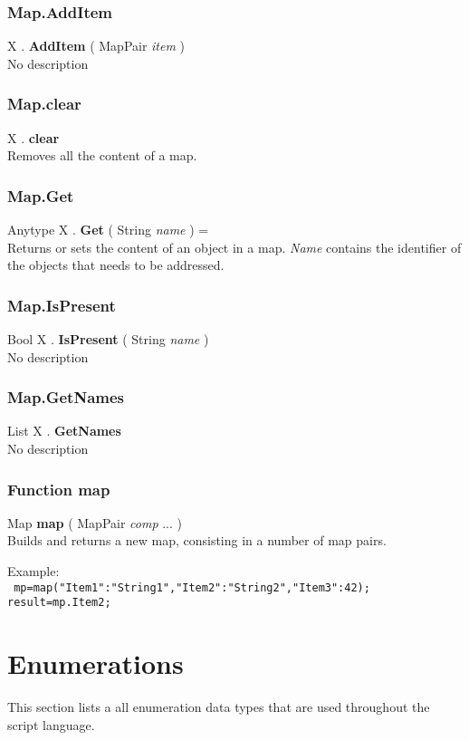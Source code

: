 \documentclass[10pt]{book}
\newcommand{\sourcecode}[1]{\texttt{#1}}
\newcommand{\var}[1]{\textit{#1}}
\begin{document}
\subsubsection{Map.AddItem \label{F:Map:AddItem}}
X . \textbf{AddItem} ( MapPair \textit{item} ) \\
No description

\subsubsection{Map.clear \label{F:Map:clear}}
X . \textbf{clear} \\
Removes all the content of a map.

\subsubsection{Map.Get \label{F:Map:Get}}
Anytype X . \textbf{Get} ( String \textit{name} ) = \\
Returns or sets the content of an object in a map. \var{Name} contains the identifier of the objects that needs to be addressed.

\subsubsection{Map.IsPresent \label{F:Map:IsPresent}}
Bool X . \textbf{IsPresent} ( String \textit{name} ) \\
No description

\subsubsection{Map.GetNames \label{F:Map:GetNames}}
List X . \textbf{GetNames} \\
No description

\subsubsection{Function map \label{F:map}}
Map \textbf{map} ( MapPair \textit{comp} ...  ) \\
Builds and returns a new map, consisting in a number of map pairs.

Example: \\
\sourcecode{
mp=map("Item1":"String1","Item2":"String2","Item3":42);
result=mp.Item2;
}

\section{Enumerations \label{Enumerations}}
This section lists a all enumeration data types that are used throughout the script language.
\end{document}
